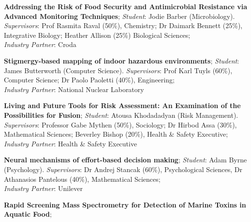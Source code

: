 \documentclass[11pt]{article}%
\begin{document}

\vspace{5pt}

\begin{minipage}{0.99\textwidth}

\begin{itemize}
{\small
\item {\bf Addressing the Risk of Food Security and Antimicrobial Resistance via Advanced Monitoring Techniques};
\textit{Student}: Jodie Barber (Microbiology). 
\textit{Supervisors}: Prof Rasmita Raval (50{\%}), Chemistry; Dr Daimark Bennett (25{\%}), Integrative Biology; Heather Allison (25{\%}) Biological Sciences;\\
\textit{Industry Partner}: Croda 
\vspace{5pt}
\item {\bf Stigmergy-based mapping of indoor hazardous environments};
\textit{Student}: James Butterworth (Computer Science). 
\textit{Supervisors}: Prof Karl Tuyls (60{\%}), Computer Science; Dr Paolo Paoletti (40{\%}), Engineering; \\
\textit{Industry Partner}: National Nuclear Laboratory
\vspace{5pt}
\item {\bf Living and Future Tools for Risk Assessment: An Examination of the Possibilities for Fusion};
\textit{Student}: Atousa Khodadadyan (Risk Management). 
\textit{Supervisors}: Professor Gabe Mythen (50{\%}), Sociology; Dr Hirbod Assa (30{\%}), Mathematical Sciences; Beverley Bishop (20{\%}), Health \& Safety Executive; \\
\textit{Industry Partner}: Health \& Safety Executive
\vspace{5pt}
\item {\bf Neural mechanisms of effort-based decision making};
\textit{Student}: Adam Byrne (Psychology). 
\textit{Supervisors}: Dr Andrej Stancak (60{\%}), Psychological Sciences, Dr Athanasios Pantelous (40{\%}), Mathematical Sciences; \\
\textit{Industry Partner}: Unilever
\vspace{5pt}
\item {\bf Rapid Screening Mass Spectrometry for Detection of Marine Toxins in Aquatic Food};
}
\end{itemize}
\end{minipage}
\end{document}
